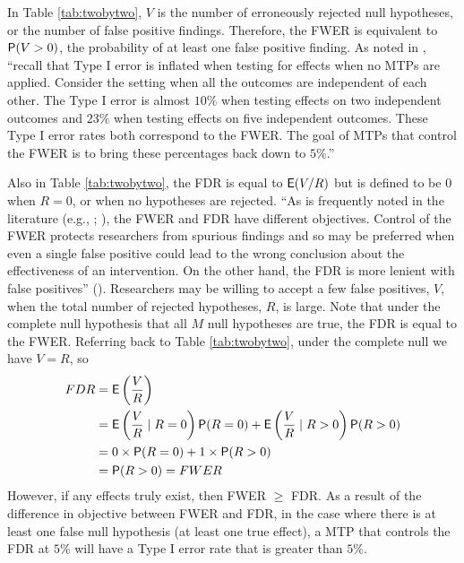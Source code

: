 \documentclass[
]{jss}
\begin{document}
In Table \ref{tab:twobytwo}, \(V\) is the number of erroneously rejected
null hypotheses, or the number of false positive findings. Therefore,
the FWER is equivalent to \(\mathsf{P}(V > 0)\), the probability of at least
one false positive finding. As noted in \citet{Porter2018}, ``recall
that Type I error is inflated when testing for effects when no MTPs are
applied. Consider the setting when all the outcomes are independent of
each other. The Type I error is almost \(10\%\) when testing effects on
two independent outcomes and \(23\%\) when testing effects on five
independent outcomes. These Type I error rates both correspond to the
FWER. The goal of MTPs that control the FWER is to bring these
percentages back down to \(5\%\).''

Also in Table \ref{tab:twobytwo}, the FDR is equal to \(\mathsf{E}(V/R)\) but is
defined to be \(0\) when \(R=0\), or when no hypotheses are rejected.
``As is frequently noted in the literature (e.g., \citet{RN352};
\citet{RN23748}), the FWER and FDR have different objectives. Control of
the FWER protects researchers from spurious findings and so may be
preferred when even a single false positive could lead to the wrong
conclusion about the effectiveness of an intervention. On the other
hand, the FDR is more lenient with false positives''
(\citet{Porter2018}). Researchers may be willing to accept a few false
positives, \(V\), when the total number of rejected hypotheses, \(R\),
is large. Note that under the complete null hypothesis that all \(M\)
null hypotheses are true, the FDR is equal to the FWER. Referring back
to Table \ref{tab:twobytwo}, under the complete null we have \(V = R\),
so \begin{align*}
FDR &= \mathsf{E}\left(\frac{V}{R}\right)\\
&=  \mathsf{E}\left(\frac{V}{R}\mid R = 0\right) \mathsf{P}(R = 0) + \mathsf{E}\left(\frac{V}{R} \mid R > 0\right)\mathsf{P}(R > 0) \\
&= 0 \times \mathsf{P}(R = 0) + 1 \times \mathsf{P}(R > 0) \\
&= \mathsf{P}(R > 0) = FWER
\end{align*} However, if any effects truly exist, then FWER \(\geq\)
FDR. As a result of the difference in objective between FWER and FDR, in
the case where there is at least one false null hypothesis (at least one
true effect), a MTP that controls the FDR at \(5\%\) will have a Type I
error rate that is greater than \(5\%\).
\end{document}
